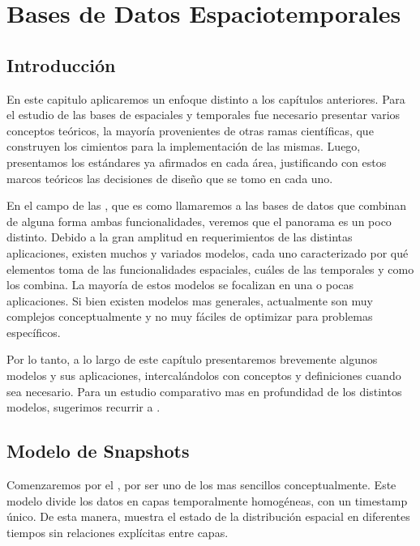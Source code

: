 \chapter{Bases de Datos Espaciotemporales}  \label{cap:et}

\section{Introducción} \label{sec:st:intro}

En este capitulo aplicaremos un enfoque distinto a los capítulos anteriores.
Para el estudio de las bases de espaciales y temporales fue necesario presentar varios conceptos teóricos,
la mayoría provenientes de otras ramas científicas, que construyen los cimientos para la implementación de las mismas.
Luego, presentamos los estándares ya afirmados en cada área, justificando con estos marcos teóricos las decisiones de diseño que se tomo en cada uno.

En el campo de las ,
que es como llamaremos a las bases de datos que combinan de alguna forma ambas funcionalidades,
veremos que el panorama es un poco distinto.
Debido a la gran amplitud en requerimientos de las distintas aplicaciones,
existen muchos y variados modelos, cada uno caracterizado por
qué elementos toma de las funcionalidades espaciales, cuáles de las temporales y como los combina.
La mayoría de estos modelos se focalizan en una o pocas aplicaciones.
Si bien existen modelos mas generales, actualmente son muy complejos conceptualmente
y no muy fáciles de optimizar para problemas específicos.

Por lo tanto, a lo largo de este capítulo presentaremos brevemente algunos modelos y sus aplicaciones, intercalándolos con conceptos y definiciones cuando sea necesario.
Para un estudio comparativo mas en profundidad de los distintos modelos, sugerimos recurrir a \cite{sp:litreview}.

\section{Modelo de Snapshots}

Comenzaremos por el \textsuperscript{\cite{sp:snapshot}}, por ser uno de los mas sencillos conceptualmente.
Este modelo divide los datos en capas temporalmente homogéneas, con un timestamp único.
De esta manera, muestra el estado de la distribución espacial en diferentes tiempos sin relaciones explícitas entre capas.

